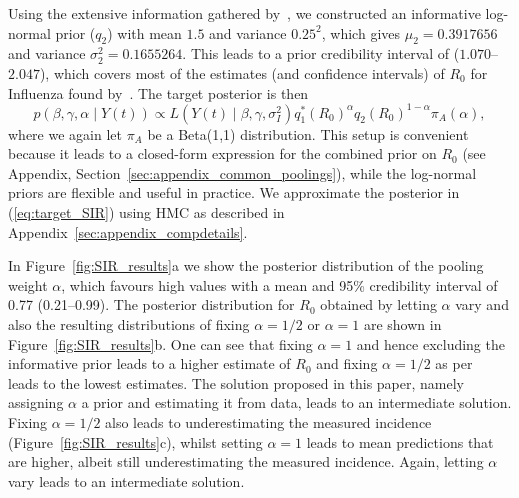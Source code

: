 \documentclass[a4paper, notitlepage, 11pt]{article}
\begin{document}
Using the extensive information gathered by~\cite{Biggerstaff2014}, we constructed an informative log-normal prior ($q_2$) with mean $1.5$ and variance $0.25^2$, which gives $\mu_2 = 0.3917656$ and variance $\sigma_2^2 =  0.1655264$.
This leads to a prior credibility interval of ($1.070$--$2.047$), which covers most of the estimates (and confidence intervals) of $R_0$ for Influenza found by~\cite{Biggerstaff2014}.
The target posterior is then
\begin{equation}
 \label{eq:target_SIR}
 p(\beta, \gamma, \alpha \mid Y(t)) \propto  L(Y(t)\mid \beta, \gamma, \sigma_I^2) q_1^\ast(R_0)^\alpha q_2(R_0)^{1-\alpha}\pi_A(\alpha),
\end{equation}
where we again let $\pi_A$ be a Beta(1,1) distribution.
This setup is convenient because it leads to a closed-form expression for the combined prior on $R_0$ (see Appendix, Section~\ref{sec:appendix_common_poolings}), while the log-normal priors are flexible and useful in practice.
We approximate the posterior in (\ref{eq:target_SIR}) using HMC as described in Appendix~\ref{sec:appendix_compdetails}.

In Figure~\ref{fig:SIR_results}a we show the posterior distribution of the pooling weight $\alpha$, which favours high values with a mean and 95\% credibility interval of 0.77 (0.21--0.99).
The posterior distribution for $R_0$ obtained by letting $\alpha$ vary and also the resulting distributions of fixing $\alpha = 1/2$ or $\alpha = 1$ are shown in Figure~\ref{fig:SIR_results}b.
One can see that fixing $\alpha = 1$ and hence excluding the informative prior leads to a higher estimate of $R_0$ and fixing $\alpha = 1/2$ as per~\cite{Poole2000} leads to the lowest estimates.
The solution proposed in this paper, namely assigning $\alpha$ a prior and estimating it from data, leads to an intermediate solution.
Fixing $\alpha = 1/2$ also leads to underestimating the measured incidence (Figure~\ref{fig:SIR_results}c), whilst setting $\alpha = 1$ leads to mean predictions that are higher, albeit still underestimating the measured incidence.
Again, letting $\alpha$ vary leads to an intermediate solution.
\end{document}
